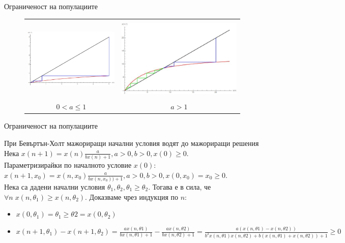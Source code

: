 \begin{frame}[t]{Ограниченост на популациите}


\begin{center}


\begin{figure}
\begin{tabular}{c c}
\includegraphics[width=4.5cm,height=4cm]{climbing1} &
\includegraphics[width=6cm,height=4cm]{climbing2} \\
{$0 < a \leq 1$} & {$a > 1$} \\
\end{tabular}
\end{figure}

\end{center}

\end{frame}


\begin{frame}[t]{Ограниченост на популациите}
	
\begin{block}{При Бевъртън-Холт мажориращи начални условия водят до мажориращи решения}
Нека $x(n+1)=x(n)\frac{a}{b x(n) + 1}, a > 0, b > 0,x(0) \geq 0$. \\
Параметризирайки по началното условие $x(0)$: \\
$x(n+1,x_{0})= x(n,x_{0})\frac{a}{b x(n,x_{0})) + 1}, a > 0, b > 0,x(0, x_{0}) = x_{0} \geq 0$. \\
Нека са дадени начални условия $\theta_{1}, \theta_{2}, \theta_{1} \geq \theta_{2}$. Тогава е в сила, че $\forall{n} \; x(n,\theta_{1}) \geq x(n,\theta_{2})$. Доказваме чрез индукция по $n$:
\begin{itemize}
\item $x(0, \theta_{1}) = \theta_{1} \geq \theta{2} = x(0, \theta_{2})$
\item $x(n+1, \theta_{1}) - x(n+1, \theta_{2}) =\frac{a x(n,\theta{1})}{b x(n,\theta{1}) + 1} - \frac{a x(n,\theta{2})}{b x(n,\theta{2}) + 1} = \frac{a (x(n,\theta{1}) - x(n,\theta{2}))}{b^{2} x(n,\theta{1}) x(n,\theta{2}) + b(x(n,\theta{1}) + x(n,\theta{2})) + 1} \geq 0$
\end{itemize}

\end{block}

\end{frame}



